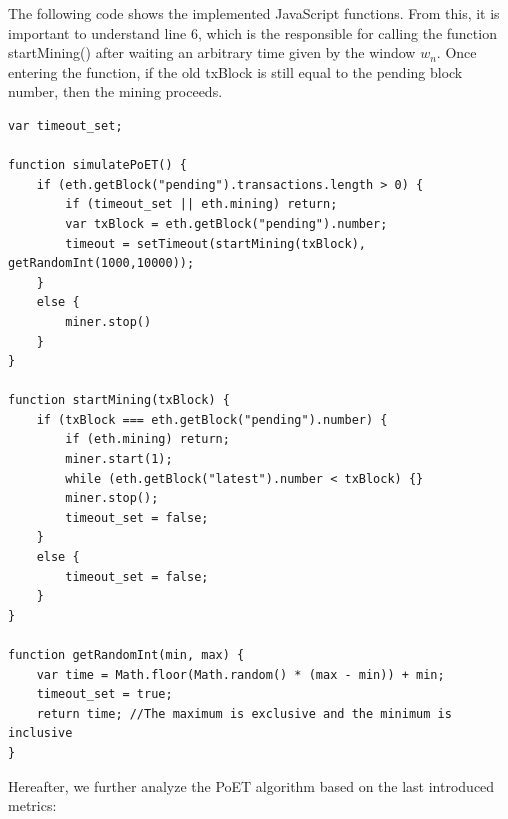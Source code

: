 The following code shows the implemented JavaScript functions. From this, it is important to understand line 6, which is the responsible for calling the function startMining() after waiting an arbitrary time given by the window $w_n$. Once entering the function, if the old txBlock is still equal to the pending block number, then the mining proceeds.
\newline

\begin{lstlisting}
var timeout_set;

function simulatePoET() {
    if (eth.getBlock("pending").transactions.length > 0) {
        if (timeout_set || eth.mining) return;
        var txBlock = eth.getBlock("pending").number;
        timeout = setTimeout(startMining(txBlock), getRandomInt(1000,10000));
    }
    else {
        miner.stop()
    }
}

function startMining(txBlock) {
    if (txBlock === eth.getBlock("pending").number) {
        if (eth.mining) return;
        miner.start(1);
        while (eth.getBlock("latest").number < txBlock) {}
        miner.stop();
        timeout_set = false;
    }
    else {
        timeout_set = false;
    }
}

function getRandomInt(min, max) {
    var time = Math.floor(Math.random() * (max - min)) + min;
    timeout_set = true;
    return time; //The maximum is exclusive and the minimum is inclusive
}
\end{lstlisting}

Hereafter, we further analyze the PoET algorithm based on the last introduced metrics: 

